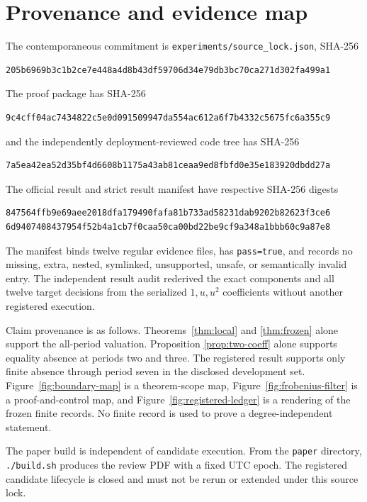 \documentclass[11pt]{article}
\theoremstyle{definition}
\theoremstyle{remark}
\begin{document}
\section{Provenance and evidence map}
\label{app:provenance}

The contemporaneous commitment is
\texttt{experiments/source\_lock.json}, SHA-256
\begin{verbatim}
205b6969b3c1b2ce7e448a4d8b43df59706d34e79db3bc70ca271d302fa499a1
\end{verbatim}
The proof package has SHA-256
\begin{verbatim}
9c4cff04ac7434822c5e0d091509947da554ac612a6f7b4332c5675fc6a355c9
\end{verbatim}
and the independently deployment-reviewed code tree has SHA-256
\begin{verbatim}
7a5ea42ea52d35bf4d6608b1175a43ab81ceaa9ed8fbfd0e35e183920dbdd27a
\end{verbatim}
The official result and strict result manifest have respective SHA-256
digests
\begin{verbatim}
847564ffb9e69aee2018dfa179490fafa81b733ad58231dab9202b82623f3ce6
6d9407408437954f52b4a1cb7f0caa50ca00bd22be9cf9a348a1bbb60c9a87e8
\end{verbatim}
The manifest binds twelve regular evidence files, has
\texttt{pass=true}, and records no missing, extra, nested, symlinked,
unsupported, unsafe, or semantically invalid entry.  The independent result
audit rederived the exact components and all twelve target decisions from the
serialized \(1,u,u^2\) coefficients without another registered execution.

Claim provenance is as follows.  Theorems~\ref{thm:local} and
\ref{thm:frozen} alone support the all-period valuation.  Proposition
\ref{prop:two-coeff} alone supports equality absence at periods two and
three.  The registered result supports only finite absence through period
seven in the disclosed development set.  Figure~\ref{fig:boundary-map} is a
theorem-scope map, Figure~\ref{fig:frobenius-filter} is a proof-and-control
map, and
Figure~\ref{fig:registered-ledger} is a rendering of the frozen finite
records.  No finite record is used to prove a degree-independent statement.

The paper build is independent of candidate execution.  From the
\texttt{paper} directory, \texttt{./build.sh} produces the review PDF with a
fixed UTC epoch.  The registered candidate lifecycle is closed and must not
be rerun or extended under this source lock.
\end{document}
